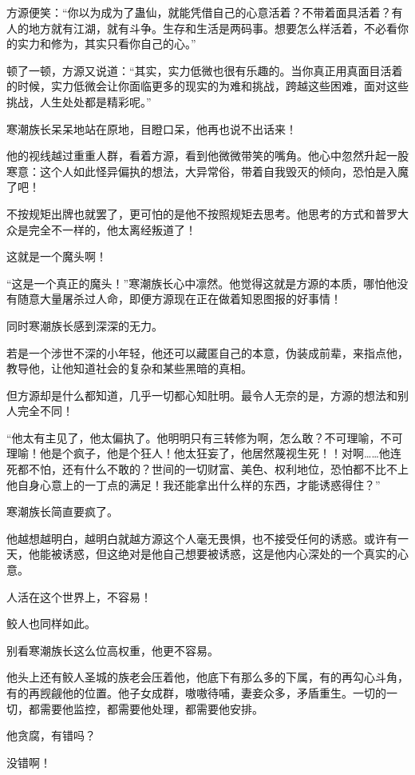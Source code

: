 \begin{this_body}
方源便笑：“你以为成为了蛊仙，就能凭借自己的心意活着？不带着面具活着？有人的地方就有江湖，就有斗争。生存和生活是两码事。想要怎么样活着，不必看你的实力和修为，其实只看你自己的心。”

顿了一顿，方源又说道：“其实，实力低微也很有乐趣的。当你真正用真面目活着的时候，实力低微会让你面临更多的现实的为难和挑战，跨越这些困难，面对这些挑战，人生处处都是精彩呢。”

寒潮族长呆呆地站在原地，目瞪口呆，他再也说不出话来！

他的视线越过重重人群，看着方源，看到他微微带笑的嘴角。他心中忽然升起一股寒意：这个人如此怪异偏执的想法，大异常俗，带着自我毁灭的倾向，恐怕是入魔了吧！

不按规矩出牌也就罢了，更可怕的是他不按照规矩去思考。他思考的方式和普罗大众是完全不一样的，他太离经叛道了！

这就是一个魔头啊！

“这是一个真正的魔头！”寒潮族长心中凛然。他觉得这就是方源的本质，哪怕他没有随意大量屠杀过人命，即便方源现在正在做着知恩图报的好事情！

同时寒潮族长感到深深的无力。

若是一个涉世不深的小年轻，他还可以藏匿自己的本意，伪装成前辈，来指点他，教导他，让他知道社会的复杂和某些黑暗的真相。

但方源却是什么都知道，几乎一切都心知肚明。最令人无奈的是，方源的想法和别人完全不同！

“他太有主见了，他太偏执了。他明明只有三转修为啊，怎么敢？不可理喻，不可理喻！他是个疯子，他是个狂人！他太狂妄了，他居然蔑视生死！！对啊……他连死都不怕，还有什么不敢的？世间的一切财富、美色、权利地位，恐怕都不比不上他自身心意上的一丁点的满足！我还能拿出什么样的东西，才能诱惑得住？”

寒潮族长简直要疯了。

他越想越明白，越明白就越方源这个人毫无畏惧，也不接受任何的诱惑。或许有一天，他能被诱惑，但这绝对是他自己想要被诱惑，这是他内心深处的一个真实的心意。

人活在这个世界上，不容易！

鲛人也同样如此。

别看寒潮族长这么位高权重，他更不容易。

他头上还有鲛人圣城的族老会压着他，他底下有那么多的下属，有的再勾心斗角，有的再觊觎他的位置。他子女成群，嗷嗷待哺，妻妾众多，矛盾重生。一切的一切，都需要他监控，都需要他处理，都需要他安排。

他贪腐，有错吗？

没错啊！


\end{this_body}
